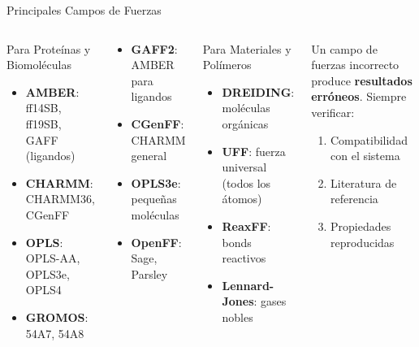 \documentclass[aspectratio=169, 10pt]{beamer}
\begin{document}
\begin{frame}{Principales Campos de Fuerzas}

\begin{columns}[T]
\begin{block}{Para Proteínas y Biomoléculas}
  \begin{itemize}
    \item \textbf{AMBER}: ff14SB, ff19SB, GAFF (ligandos)
    \item \textbf{CHARMM}: CHARMM36, CGenFF
    \item \textbf{OPLS}: OPLS-AA, OPLS3e, OPLS4
    \item \textbf{GROMOS}: 54A7, 54A8
  \end{itemize}
\end{block}
\vspace{0.3em}
\begin{tcolorbox}[warningbox, title={Para moléculas pequeñas}, equal height group=ehg-ff-b]
\small
\begin{itemize}
  \item \textbf{GAFF2}: AMBER para ligandos
  \item \textbf{CGenFF}: CHARMM general
  \item \textbf{OPLS3e}: pequeñas moléculas
  \item \textbf{OpenFF}: Sage, Parsley
\end{itemize}
\end{tcolorbox}

\begin{block}{Para Materiales y Polímeros}
  \begin{itemize}
    \item \textbf{DREIDING}: moléculas orgánicas
    \item \textbf{UFF}: fuerza universal (todos los átomos)
    \item \textbf{ReaxFF}: bonds reactivos
    \item \textbf{Lennard-Jones}: gases nobles
  \end{itemize}
\end{block}
\vspace{0.3em}
\begin{tcolorbox}[definitionbox, title={Validación crítica}, equal height group=ehg-ff-b]
\small
Un campo de fuerzas incorrecto produce \textbf{resultados erróneos}. Siempre verificar:
\begin{enumerate}
  \item Compatibilidad con el sistema
  \item Literatura de referencia
  \item Propiedades reproducidas
\end{enumerate}
\end{tcolorbox}
\end{columns}
\end{frame}
\end{document}
